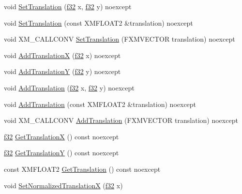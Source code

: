 \begin{DoxyCompactItemize}
\item 
void \hyperlink{structmage_1_1_sprite_transform_ab5def0c644f41c2177921238bbdd4b9d}{Set\+Translation} (\hyperlink{namespacemage_a6a44ad388483959dc4dff9f2aef91431}{f32} x, \hyperlink{namespacemage_a6a44ad388483959dc4dff9f2aef91431}{f32} y) noexcept
\item 
void \hyperlink{structmage_1_1_sprite_transform_ad5429c09032b52459ac1840ad07290f4}{Set\+Translation} (const X\+M\+F\+L\+O\+A\+T2 \&translation) noexcept
\item 
void X\+M\+\_\+\+C\+A\+L\+L\+C\+O\+NV \hyperlink{structmage_1_1_sprite_transform_a597ef325d25183a969915be48d0a99f7}{Set\+Translation} (F\+X\+M\+V\+E\+C\+T\+OR translation) noexcept
\item 
void \hyperlink{structmage_1_1_sprite_transform_ae24bc2d7c5613ec24a8aadb31c585c63}{Add\+TranslationX} (\hyperlink{namespacemage_a6a44ad388483959dc4dff9f2aef91431}{f32} x) noexcept
\item 
void \hyperlink{structmage_1_1_sprite_transform_ae7ef091cd89f75759c34f348ea1c263e}{Add\+TranslationY} (\hyperlink{namespacemage_a6a44ad388483959dc4dff9f2aef91431}{f32} y) noexcept
\item 
void \hyperlink{structmage_1_1_sprite_transform_ad8ebff7e041785b13f56f74dad35d4fa}{Add\+Translation} (\hyperlink{namespacemage_a6a44ad388483959dc4dff9f2aef91431}{f32} x, \hyperlink{namespacemage_a6a44ad388483959dc4dff9f2aef91431}{f32} y) noexcept
\item 
void \hyperlink{structmage_1_1_sprite_transform_a257e6a9e0d7762963813c00c8ba2517c}{Add\+Translation} (const X\+M\+F\+L\+O\+A\+T2 \&translation) noexcept
\item 
void X\+M\+\_\+\+C\+A\+L\+L\+C\+O\+NV \hyperlink{structmage_1_1_sprite_transform_a38ce964e75aca33eac312a995d142495}{Add\+Translation} (F\+X\+M\+V\+E\+C\+T\+OR translation) noexcept
\item 
\hyperlink{namespacemage_a6a44ad388483959dc4dff9f2aef91431}{f32} \hyperlink{structmage_1_1_sprite_transform_ad119ea224d5862f886c1e50d4f733fc5}{Get\+TranslationX} () const noexcept
\item 
\hyperlink{namespacemage_a6a44ad388483959dc4dff9f2aef91431}{f32} \hyperlink{structmage_1_1_sprite_transform_ae88818791dbced7d4ca771f0d0bd53cd}{Get\+TranslationY} () const noexcept
\item 
const X\+M\+F\+L\+O\+A\+T2 \hyperlink{structmage_1_1_sprite_transform_ae8103fdc37f52d294d3703709949a30c}{Get\+Translation} () const noexcept
\item 
void \hyperlink{structmage_1_1_sprite_transform_a39b12f387cfd61ca249a11e064274463}{Set\+Normalized\+TranslationX} (\hyperlink{namespacemage_a6a44ad388483959dc4dff9f2aef91431}{f32} x)

\end{DoxyCompactItemize}
